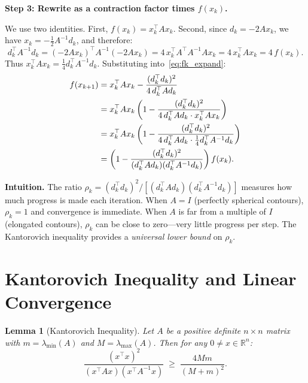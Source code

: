 \documentclass[11pt]{article}
\theoremstyle{definition}
\theoremstyle{plain}
\newtheorem{lemma}{Lemma}
\newcommand{\R}{\mathbb{R}}
\begin{document}
\medskip\noindent\textbf{Step 3: Rewrite as a contraction factor times $f(x_k)$.}

We use two identities. First, $f(x_k) = x_k^\top Ax_k$. Second,
since $d_k = -2Ax_k$, we have $x_k = -\tfrac{1}{2}A^{-1}d_k$, and therefore:
\[
  d_k^\top A^{-1}d_k
  = (-2Ax_k)^\top A^{-1}(-2Ax_k)
  = 4\,x_k^\top A^\top A^{-1} Ax_k
  = 4\,x_k^\top Ax_k
  = 4\,f(x_k).
\]
Thus $x_k^\top Ax_k = \tfrac{1}{4}d_k^\top A^{-1}d_k$. Substituting into~\eqref{eq:fk_expand}:
\begin{align}
  f(x_{k+1})
  &= x_k^\top Ax_k - \frac{(d_k^\top d_k)^2}{4\,d_k^\top Ad_k} \notag\\
  &= x_k^\top Ax_k\left(1 - \frac{(d_k^\top d_k)^2}{4\,d_k^\top Ad_k \cdot x_k^\top Ax_k}\right) \notag\\
  &= x_k^\top Ax_k\left(1 - \frac{(d_k^\top d_k)^2}{4\,d_k^\top Ad_k \cdot \tfrac{1}{4}d_k^\top A^{-1}d_k}\right) \notag\\
  &= \left(1 - \frac{(d_k^\top d_k)^2}{(d_k^\top Ad_k)(d_k^\top A^{-1}d_k)}\right)f(x_k).
  \label{eq:ratio_form}
\end{align}

\noindent\textbf{Intuition.}
The ratio $\rho_k = (d_k^\top d_k)^2/[(d_k^\top Ad_k)(d_k^\top A^{-1}d_k)]$ measures
how much progress is made each iteration. When $A=I$ (perfectly spherical contours),
$\rho_k=1$ and convergence is immediate. When $A$ is far from a multiple of $I$
(elongated contours), $\rho_k$ can be close to zero---very little progress per step.
The Kantorovich inequality provides a \emph{universal lower bound} on $\rho_k$.

\section{Kantorovich Inequality and Linear Convergence}

\begin{lemma}[Kantorovich Inequality]\label{lem:kantorovich}
Let $A$ be a positive definite $n\times n$ matrix with
$m=\lambda_{\min}(A)$ and $M=\lambda_{\max}(A)$. Then for any
$0\neq x\in\R^n$:
\begin{equation}\label{eq:kantorovich}
  \frac{(x^\top x)^2}{(x^\top Ax)(x^\top A^{-1}x)}
  \;\geq\; \frac{4Mm}{(M+m)^2}.
\end{equation}
\end{lemma}
\end{document}
